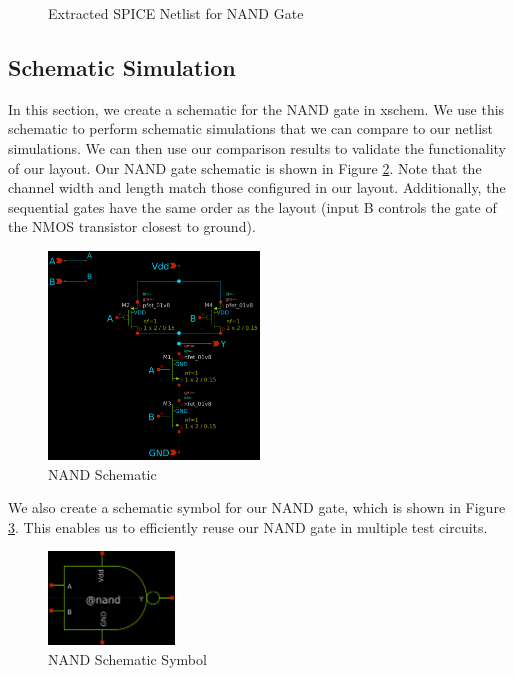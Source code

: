 \documentclass{article}
\begin{document}
	\begin{figure}[H]
		
		\caption{Extracted SPICE Netlist for NAND Gate}
		\label{fig::nand_netlist}
	\end{figure}
	
	\subsection{Schematic Simulation}
	
	In this section, we create a schematic for the NAND gate in xschem. We use this schematic to perform schematic simulations that we can compare to our netlist simulations. We can then use our comparison results to validate the functionality of our layout. Our NAND gate schematic is shown in Figure \ref{fig::nand_schematic}. Note that the channel width and length match those configured in our layout. Additionally, the sequential gates have the same order as the layout (input B controls the gate of the NMOS transistor closest to ground).
	
	\begin{figure}[H]
		\centerline{\includegraphics[width=0.5\textwidth]{nand_schematic.png}}
		\caption{NAND Schematic}
		\label{fig::nand_schematic}
	\end{figure}
	
	\noindent We also create a schematic symbol for our NAND gate, which is shown in Figure \ref{fig::nand_symbol}. This enables us to efficiently reuse our NAND gate in multiple test circuits.
	
	\begin{figure}[H]
		\centerline{\includegraphics[width=0.3\textwidth]{nand_symbol.png}}
		\caption{NAND Schematic Symbol}
		\label{fig::nand_symbol}
	\end{figure}
	
\end{document}
